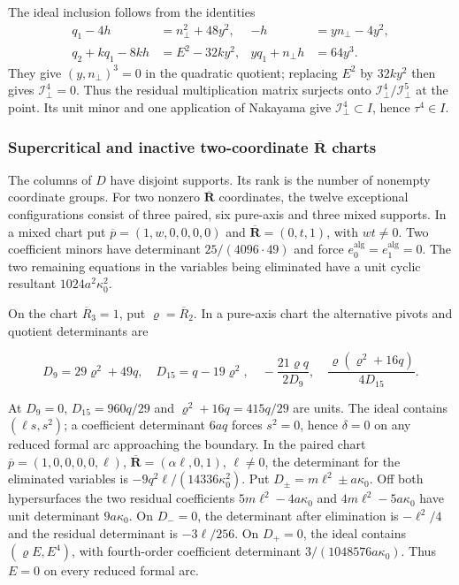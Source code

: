 \documentclass[11pt,a4paper]{article}
\numberwithin{equation}{section}
\theoremstyle{plain}
\theoremstyle{definition}
\theoremstyle{remark}
\begin{document}
The ideal inclusion follows from the identities
\begin{align*}
 q_1-4h&=n_\perp^2+48y^2,& -h&=yn_\perp-4y^2,\\
 q_2+kq_1-8kh&=E^2-32ky^2,& yq_1+n_\perp h&=64y^3.
\end{align*}
They give $(y,n_\perp)^3=0$ in the quadratic quotient; replacing $E^2$ by
$32ky^2$ then gives $\mathcal I_\perp^4=0$. Thus the residual multiplication
matrix surjects onto $\mathcal I_\perp^4/\mathcal I_\perp^5$ at the point. Its unit minor and one
application of Nakayama give $\mathcal I_\perp^4\subset I$, hence $\tau^4\in I$.

\subsubsection{Supercritical and inactive two-coordinate $\overline{\boldsymbol R}$ charts}\label{r3:two-supports}

The columns of $D$ have disjoint supports. Its rank is the number of nonempty coordinate groups. For two nonzero $\overline{\boldsymbol R}$ coordinates, the twelve exceptional configurations consist of three paired, six pure-axis and three mixed supports. In a mixed chart put $\overline p=(1,w,0,0,0,0)$ and $\overline{\boldsymbol R}=(0,t,1)$, with $wt\ne0$. Two coefficient minors have determinant $25/(4096\cdot49)$ and force $e_0^{\mathrm{alg}}=e_1^{\mathrm{alg}}=0$. The two remaining equations in the variables being eliminated have a unit cyclic resultant $1024a^2\kappa_0 ^2$.

On the chart $\overline R_3=1$, put $\varrho=\overline R_2$.
In a pure-axis chart the alternative pivots and quotient determinants are

\begin{equation}D_9=29\varrho^2+49q,\quad D_{15}=q-19\varrho^2,\quad-\frac{21\varrho q}{2D_9},\quad\frac{\varrho(\varrho^2+16q)}{4D_{15}}.\end{equation}

At $D_9=0$, $D_{15}=960q/29$ and $\varrho^2+16q=415q/29$ are units. The ideal contains $(\ell s,s^2)$; a coefficient determinant $6aq$ forces $s^2=0$, hence $\delta=0$ on any reduced formal arc approaching the boundary. In the paired chart $\overline p=(1,0,0,0,0,\ell)$, $\overline{\boldsymbol R}=(\alpha\ell,0,1)$, $\ell\ne0$, the determinant for the eliminated variables is $-9q^2\ell/(14336\kappa_0 ^2)$. Put $D_\pm=m\ell^2\pm a\kappa_0 $. Off both hypersurfaces the two residual coefficients $5m\ell^2-4a\kappa_0 $ and $4m\ell^2-5a\kappa_0 $ have unit determinant $9a\kappa_0 $. On $D_-=0$, the determinant after elimination is $-\ell^2/4$ and the residual determinant is $-3\ell/256$. On $D_+=0$, the ideal contains $(\varrho E,E^4)$, with fourth-order coefficient determinant $3/(1048576a\kappa_0 )$. Thus $E=0$ on every reduced formal arc.
\end{document}
